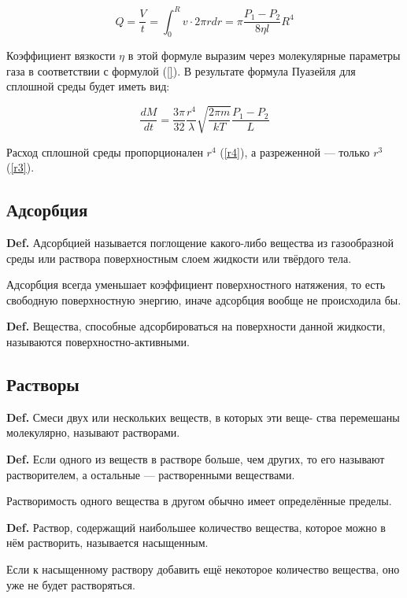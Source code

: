 \documentclass[a4paper,12pt]{article} %
\begin{document}
\begin{equation}
  Q = \frac{V}{t} = \int_{0}^{R} v \cdot 2 \pi r dr = \pi \frac{P_1 - P_2}{8 \eta l} R^4
\end{equation}

Коэффициент вязкости $\eta$ в этой формуле выразим через молекулярные параметры газа в соответствии с формулой (\ref{}). В результате формула Пуазейля для сплошной среды будет иметь вид:

\begin{equation}
  \frac{d M}{d t} = \frac{3 \pi}{32} \frac{r^4}{\lambda} \sqrt{\frac{2 \pi m}{k T}} \frac{P_1 - P_2}{L}
  \label{r4}
\end{equation}

Расход сплошной среды пропорционален $r^4$ (\ref{r4}), а разреженной — только $r^3$ (\ref{r3}). 

\subsection*{Адсорбция}

\textbf{Def.} Адсорбцией называется поглощение какого-либо вещества из газообразной среды или раствора поверхностным слоем жидкости или твёрдого тела.

Адсорбция всегда уменьшает коэффициент поверхностного натяжения, то есть свободную поверхностную энергию, иначе адсорбция вообще не происходила бы.

\textbf{Def.} Вещества, способные адсорбироваться на поверхности данной жидкости, называются поверхностно-активными.

\subsection*{Растворы}

\textbf{Def.} Смеси двух или нескольких веществ, в которых эти веще- ства перемешаны молекулярно, называют растворами.

\textbf{Def.} Если одного из веществ в растворе больше, чем других, то его называют растворителем, а остальные — растворенными веществами.

Растворимость одного вещества в другом обычно имеет определённые пределы. 

\textbf{Def.} Раствор, содержащий наибольшее количество вещества, которое можно в нём растворить, называется насыщенным. 

Если к насыщенному раствору добавить ещё некоторое количество вещества, оно уже не будет растворяться. 
\end{document}
